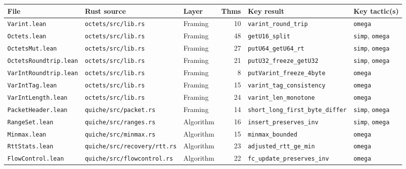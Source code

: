 \documentclass[sigconf,10pt]{acmart}
\begin{document}
\begin{table}[t]
\centering
\small
\begin{tabular}{lllrll}
\toprule
\textbf{File} & \textbf{Rust source} & \textbf{Layer} & \textbf{Thms} &
  \textbf{Key result} & \textbf{Key tactic(s)} \\
\midrule
\texttt{Varint.lean}            & \texttt{octets/src/lib.rs}          & Framing  & 10  & \texttt{varint\_round\_trip}          & \texttt{omega} \\
\texttt{Octets.lean}            & \texttt{octets/src/lib.rs}          & Framing  & 48  & \texttt{getU16\_split}                & \texttt{simp}, \texttt{omega} \\
\texttt{OctetsMut.lean}         & \texttt{octets/src/lib.rs}          & Framing  & 27  & \texttt{putU64\_getU64\_rt}           & \texttt{simp}, \texttt{omega} \\
\texttt{OctetsRoundtrip.lean}   & \texttt{octets/src/lib.rs}          & Framing  & 21  & \texttt{putU32\_freeze\_getU32}       & \texttt{simp}, \texttt{omega} \\
\texttt{VarIntRoundtrip.lean}   & \texttt{octets/src/lib.rs}          & Framing  &  8  & \texttt{putVarint\_freeze\_4byte}     & \texttt{omega} \\
\texttt{VarIntTag.lean}         & \texttt{octets/src/lib.rs}          & Framing  & 15  & \texttt{varint\_tag\_consistency}     & \texttt{omega} \\
\texttt{VarIntLength.lean}      & \texttt{octets/src/lib.rs}          & Framing  & 24  & \texttt{varint\_len\_monotone}        & \texttt{omega} \\
\texttt{PacketHeader.lean}      & \texttt{quiche/src/packet.rs}       & Framing  & 14  & \texttt{short\_long\_first\_byte\_differ} & \texttt{simp}, \texttt{omega} \\
\midrule
\texttt{RangeSet.lean}          & \texttt{quiche/src/ranges.rs}       & Algorithm & 16 & \texttt{insert\_preserves\_inv}       & \texttt{simp}, \texttt{omega} \\
\texttt{Minmax.lean}            & \texttt{quiche/src/minmax.rs}       & Algorithm & 15 & \texttt{minmax\_bounded}              & \texttt{omega} \\
\texttt{RttStats.lean}          & \texttt{quiche/src/recovery/rtt.rs} & Algorithm & 23 & \texttt{adjusted\_rtt\_ge\_min}       & \texttt{omega} \\
\texttt{FlowControl.lean}       & \texttt{quiche/src/flowcontrol.rs}  & Algorithm & 22 & \texttt{fc\_update\_preserves\_inv}   & \texttt{omega} \\

\end{tabular}
\end{table}
\end{document}
